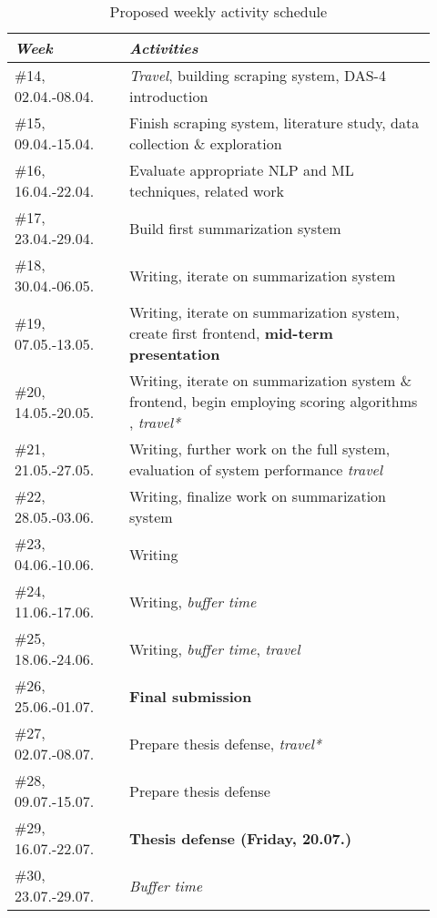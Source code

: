 \begin{table}[h]
    \centering
    \begin{tabular}{p{0.25\linewidth}p{0.67\linewidth}}
        \hline
        \emph{Week} & \emph{Activities} \\
        \hline
        \#14, 02.04.-08.04. & \textit{Travel}, building scraping system, DAS-4 introduction \\
        \#15, 09.04.-15.04. & Finish scraping system, literature study, data collection \& exploration \\
        \#16, 16.04.-22.04. & Evaluate appropriate NLP and ML techniques, related work \\
        \#17, 23.04.-29.04. & Build first summarization system \\
        \#18, 30.04.-06.05. & Writing, iterate on summarization system \\
        \#19, 07.05.-13.05. & Writing, iterate on summarization system, create first frontend, \textbf{mid-term presentation} \\
        \#20, 14.05.-20.05. & Writing, iterate on summarization system \& frontend, begin employing scoring algorithms , \textit{travel*} \\
        \#21, 21.05.-27.05. & Writing, further work on the full system, evaluation of system performance \textit{travel} \\
        \#22, 28.05.-03.06. & Writing, finalize work on summarization system \\
        \#23, 04.06.-10.06. & Writing \\
        \#24, 11.06.-17.06. & Writing, \textit{buffer time} \\
        \#25, 18.06.-24.06. & Writing, \textit{buffer time}, \textit{travel} \\
        \#26, 25.06.-01.07. & \textbf{Final submission} \\
        \hline
        \#27, 02.07.-08.07. & Prepare thesis defense, \textit{travel*} \\
        \#28, 09.07.-15.07. & Prepare thesis defense \\
        \#29, 16.07.-22.07. & \textbf{Thesis defense (Friday, 20.07.)} \\
        \#30, 23.07.-29.07. & \textit{Buffer time} \\
        \hline
    \end{tabular}
    \caption{Proposed weekly activity schedule} \label{tbl:schedule}
\end{table}